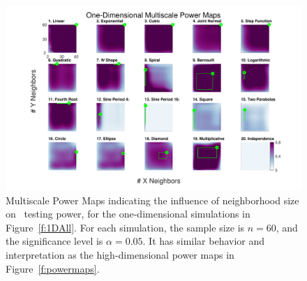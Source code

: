 \documentclass[11pt]{article}
\begin{document}
\begin{figure}[htbp]
\includegraphics[width=1.0\textwidth,trim={3cm 0.5cm 2.3cm 0.5cm},clip]{Figures/Fig1DHeat}
\caption{Multiscale Power Maps indicating the influence of neighborhood size on \Mgc~testing power, for the one-dimensional simulations in Figure~\ref{f:1DAll}. For each simulation,  the sample size is $n=60$, and the significance level is $\alpha=0.05$. It has similar behavior and interpretation as the high-dimensional power maps in Figure~\ref{f:powermaps}.}
\label{f:powermaps1}
\end{figure}
\end{document}
